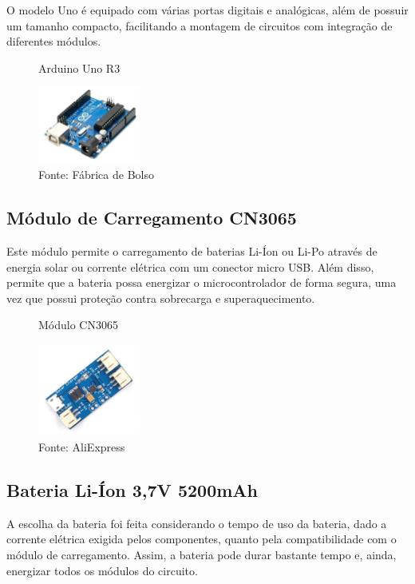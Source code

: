     O modelo Uno é equipado com várias portas digitais e analógicas, além de possuir um tamanho compacto, facilitando a montagem de circuitos com integração de diferentes módulos.

    \begin{figure}[h!]
        \captionsetup{width=1\textwidth}
        \caption{\label{fig:arduino} Arduino Uno R3}
        \centering
        \includegraphics[width=0.3\textwidth]{figuras/arduino} 
        \caption*{Fonte: Fábrica de Bolso}
    \end{figure}

    \subsection{Módulo de Carregamento CN3065}
    Este módulo permite o carregamento de baterias Li-Íon ou Li-Po através de energia solar ou corrente elétrica  com um conector micro USB. Além disso, permite que a bateria possa energizar o microcontrolador de forma segura, uma vez que possui proteção contra sobrecarga e superaquecimento.
    
    \begin{figure}[h!]
        \captionsetup{width=1\textwidth}
        \caption{\label{fig:cn3065} Módulo CN3065}
        \centering
        \includegraphics[width=0.3\textwidth]{figuras/cn3065} 
        \caption*{Fonte: AliExpress}
    \end{figure}

    \subsection{Bateria Li-Íon 3,7V 5200mAh}
    A escolha da bateria foi feita considerando o tempo de uso da bateria, dado a corrente elétrica exigida pelos componentes, quanto pela compatibilidade com o módulo de carregamento. Assim, a bateria pode durar bastante tempo e, ainda, energizar todos os módulos do circuito.

